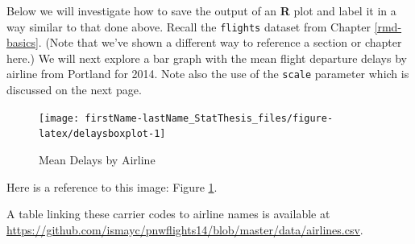 \documentclass[12pt, twoside]{amherstthesis}
\newenvironment{Shaded}{\begin{snugshade}}{\end{snugshade}}
\newcommand{\CommentTok}[1]{\textcolor[rgb]{0.56,0.35,0.01}{\textit{#1}}}
\newcommand{\DataTypeTok}[1]{\textcolor[rgb]{0.13,0.29,0.53}{#1}}
\newcommand{\KeywordTok}[1]{\textcolor[rgb]{0.13,0.29,0.53}{\textbf{#1}}}
\newcommand{\NormalTok}[1]{#1}
\newcommand{\OperatorTok}[1]{\textcolor[rgb]{0.81,0.36,0.00}{\textbf{#1}}}
\newcommand{\StringTok}[1]{\textcolor[rgb]{0.31,0.60,0.02}{#1}}
\theoremstyle{definition}
\theoremstyle{definition}
\theoremstyle{definition}
\theoremstyle{remark}
\begin{document}
Below we will investigate how to save the output of an \textbf{R} plot and label it in a way similar to that done above. Recall the \texttt{flights} dataset from Chapter \ref{rmd-basics}. (Note that we've shown a different way to reference a section or chapter here.) We will next explore a bar graph with the mean flight departure delays by airline from Portland for 2014. Note also the use of the \texttt{scale} parameter which is discussed on the next page.
\begin{Shaded}
\end{Shaded}
\begin{figure}

{\centering \texttt{[image: firstName-lastName\_StatThesis\_files/figure-latex/delaysboxplot-1]} 

}

\caption{Mean Delays by Airline}\label{fig:delaysboxplot}
\end{figure}
Here is a reference to this image: Figure \ref{fig:delaysboxplot}.

A table linking these carrier codes to airline names is available at \url{https://github.com/ismayc/pnwflights14/blob/master/data/airlines.csv}.

\clearpage
\end{document}
